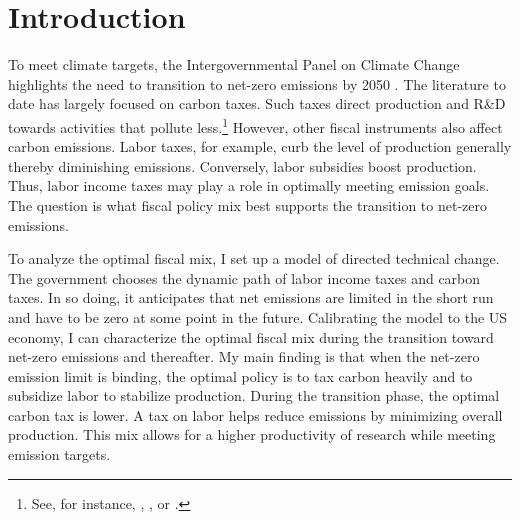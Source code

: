 \thispagestyle{empty}
\clearpage
\setcounter{page}{1}
\section{Introduction}




To meet climate targets, the Intergovernmental Panel on Climate Change highlights the need to transition to net-zero emissions by 2050 \citep{IPCC2022}.  The literature to date has largely focused on carbon taxes. Such taxes direct production and R\&D towards activities that pollute less.\footnote{ See, for instance, \cite{Acemoglu2012TheChange}, \cite{Golosov2014OptimalEquilibrium}, or \cite{Fried2018ClimateAnalysis}.} However, other fiscal instruments also affect carbon emissions. Labor taxes, for example, curb the level of production generally thereby diminishing emissions. Conversely, labor subsidies boost production. Thus, labor income taxes may play a role in optimally meeting emission goals. The question is what fiscal policy mix best supports the transition to net-zero emissions.

To analyze the optimal fiscal mix, I set up a model of directed technical change. The government chooses the dynamic path of labor income taxes and carbon taxes. In so doing, it anticipates that net emissions are limited in the short run and have to be zero  at some point in the future. Calibrating the model to the US economy, I can characterize the optimal fiscal mix during the transition toward net-zero emissions and thereafter. My main finding is that when the net-zero emission limit is binding, the optimal policy is to tax carbon heavily and to subsidize labor to stabilize production. During the transition phase, the optimal carbon tax is lower. A tax on labor helps reduce emissions by minimizing overall production. This mix allows for a higher productivity of research while meeting emission targets.

